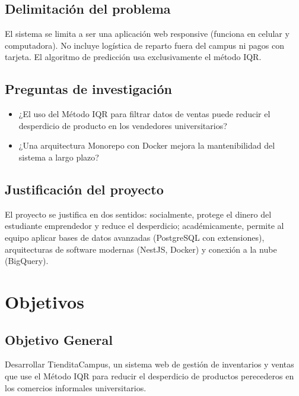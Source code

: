 \documentclass[12pt, a4paper]{article}
\begin{document}
\subsection{Delimitación del problema}
El sistema se limita a ser una aplicación web responsive (funciona en celular y computadora). No incluye logística de reparto fuera del campus ni pagos con tarjeta. El algoritmo de predicción usa exclusivamente el método IQR.

\subsection{Preguntas de investigación}
\begin{itemize}
    \item ¿El uso del Método IQR para filtrar datos de ventas puede reducir el desperdicio de producto en los vendedores universitarios?
    \item ¿Una arquitectura Monorepo con Docker mejora la mantenibilidad del sistema a largo plazo?
\end{itemize}

\subsection{Justificación del proyecto}
El proyecto se justifica en dos sentidos: socialmente, protege el dinero del estudiante emprendedor y reduce el desperdicio; académicamente, permite al equipo aplicar bases de datos avanzadas (PostgreSQL con extensiones), arquitecturas de software modernas (NestJS, Docker) y conexión a la nube (BigQuery).

\section{Objetivos}

\subsection{Objetivo General}
Desarrollar TienditaCampus, un sistema web de gestión de inventarios y ventas que use el Método IQR para reducir el desperdicio de productos perecederos en los comercios informales universitarios.
\end{document}
